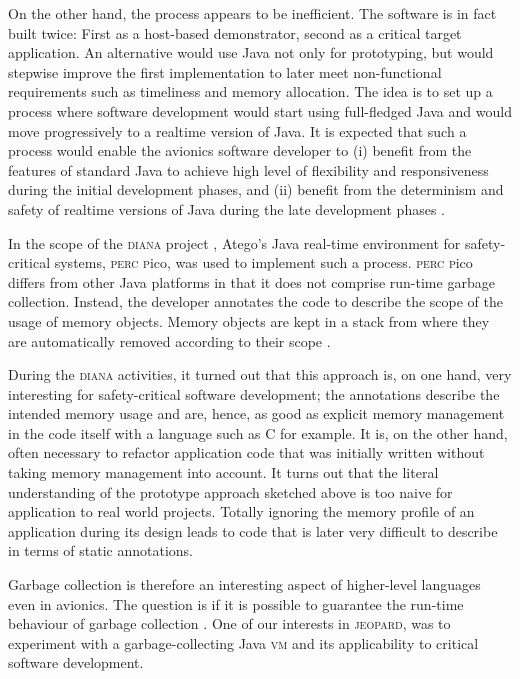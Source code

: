 \documentclass{sig-alternate}
\newcommand{\acronym}[1]{\textsc{#1}}
\begin{document}
On the other hand, the process appears to be inefficient.
The software is in fact built twice: 
First as a host-based demonstrator,
second as a critical target application.
An alternative would use Java not only for prototyping,
but would stepwise improve the first implementation
to later meet non-functional requirements such as 
timeliness and memory allocation.
The idea is to set up a process where
software development would start using full-fledged Java
and would move progressively to a realtime
version of Java. It is expected that such a process
would enable the avionics software developer to 
(i) benefit from the features of standard Java 
to achieve high level of
flexibility and responsiveness during the initial development
phases, and (ii) benefit 
from the determinism and safety of realtime
versions of Java during the late development phases \cite{scho09}.

In the scope of the \acronym{diana} project \cite{DIANA},
Atego's Java real-time environment for safety-critical systems,
\acronym{perc p}ico, was used to implement such a process.
\acronym{perc p}ico differs from other Java platforms
in that it does not comprise run-time garbage collection.
Instead, the developer annotates the code 
to describe the scope of the usage of memory objects.
Memory objects are kept in a stack
from where they are automatically removed 
according to their scope \cite{scho09}.

During the \acronym{diana} activities, it turned out
that this approach is, on one hand,
very interesting for safety-critical software development;
the annotations describe the intended memory usage
and are, hence, as good as explicit memory management
in the code itself with a language such as C for example. 
It is, on the other hand, often necessary
to refactor application code 
that was initially written 
without taking memory management into account.
It turns out that the literal understanding
of the prototype approach sketched above
is too naive for application to real world projects.
Totally ignoring the memory profile of an application
during its design leads to code that is later very difficult
to describe in terms of static annotations.

Garbage collection is therefore an interesting aspect
of higher-level languages even in avionics.
The question is if it is possible to guarantee
the run-time behaviour of garbage collection \cite{sie:02, ritz:03}.
One of our interests in \acronym{jeopard}, 
was to experiment with a garbage-collecting Java \acronym{vm}
and its applicability to critical software development.
\end{document}
